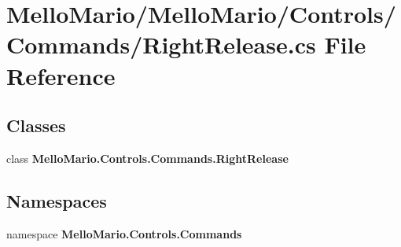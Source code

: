 \section{Mello\+Mario/\+Mello\+Mario/\+Controls/\+Commands/\+Right\+Release.cs File Reference}
\label{RightRelease_8cs}
\subsection*{Classes}
\begin{DoxyCompactItemize}
\item 
class \textbf{ Mello\+Mario.\+Controls.\+Commands.\+Right\+Release}
\end{DoxyCompactItemize}
\subsection*{Namespaces}
\begin{DoxyCompactItemize}
\item 
namespace \textbf{ Mello\+Mario.\+Controls.\+Commands}
\end{DoxyCompactItemize}
